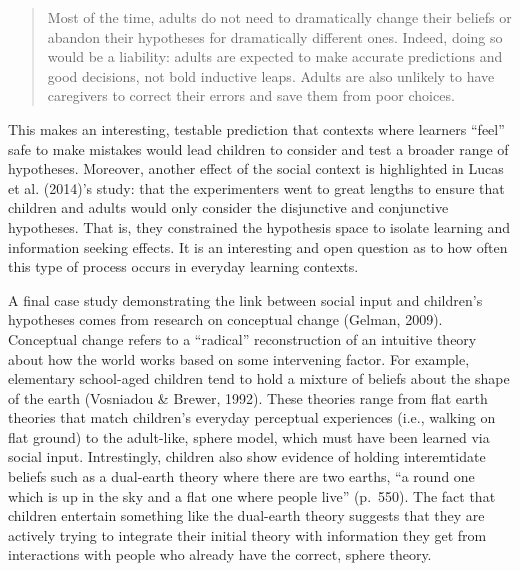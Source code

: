 \documentclass[english,floatsintext,man]{apa6}
\theoremstyle{definition}
\theoremstyle{definition}
\theoremstyle{definition}
\theoremstyle{remark}
\begin{document}
\begin{quote}
Most of the time, adults do not need to dramatically change their
beliefs or abandon their hypotheses for dramatically different ones.
Indeed, doing so would be a liability: adults are expected to make
accurate predictions and good decisions, not bold inductive leaps.
Adults are also unlikely to have caregivers to correct their errors and
save them from poor choices.
\end{quote}

\noindent
This makes an interesting, testable prediction that contexts where
learners \enquote{feel} safe to make mistakes would lead children to
consider and test a broader range of hypotheses. Moreover, another
effect of the social context is highlighted in Lucas et al. (2014)'s
study: that the experimenters went to great lengths to ensure that
children and adults would only consider the disjunctive and conjunctive
hypotheses. That is, they constrained the hypothesis space to isolate
learning and information seeking effects. It is an interesting and open
question as to how often this type of process occurs in everyday
learning contexts.

A final case study demonstrating the link between social input and
children's hypotheses comes from research on conceptual change (Gelman,
2009). Conceptual change refers to a \enquote{radical} reconstruction of
an intuitive theory about how the world works based on some intervening
factor. For example, elementary school-aged children tend to hold a
mixture of beliefs about the shape of the earth (Vosniadou \& Brewer,
1992). These theories range from flat earth theories that match
children's everyday perceptual experiences (i.e., walking on flat
ground) to the adult-like, sphere model, which must have been learned
via social input. Intrestingly, children also show evidence of holding
interemtidate beliefs such as a dual-earth theory where there are two
earths, \enquote{a round one which is up in the sky and a flat one where
people live} (p.~550). The fact that children entertain something like
the dual-earth theory suggests that they are actively trying to
integrate their initial theory with information they get from
interactions with people who already have the correct, sphere theory.
\end{document}

